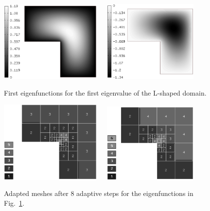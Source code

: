 \documentclass[smallextended]{svjour3}
\begin{document}
\begin{figure}[!ht]
\begin{center}
\includegraphics[width=0.45\textwidth]{lshape1.eps}\ \ \ 
\includegraphics[width=0.42\textwidth]{lshape2.eps}
\end{center}
\caption{First eigenfunctions for the first eigenvalue of the L-shaped domain.}
\label{fig:l_sh_eig1}
\end{figure}

\begin{figure}[!ht]
\begin{center}
\includegraphics[width=0.45\textwidth]{lshape3.eps}\ \ \ 
\includegraphics[width=0.42\textwidth]{lshape4.eps}
\end{center}
\caption{Adapted meshes after 8 adaptive steps for the eigenfunctions in Fig.~\ref{fig:l_sh_eig1}.}
\label{fig:l_sh_eig2}
\end{figure}
\end{document}
